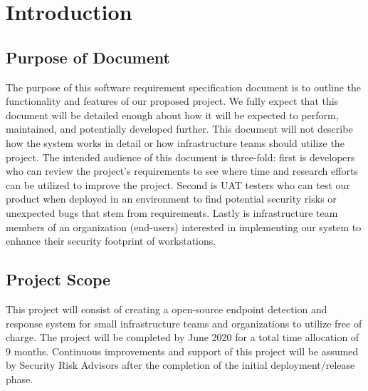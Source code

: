\documentclass{scrreprt}
\begin{document}
\chapter{Introduction}

\section{Purpose of Document}
The purpose of this software requirement specification document is to outline the functionality and features of our proposed project. We fully expect that this document will be detailed enough about how it will be expected to perform, maintained, and potentially developed further. This document will not describe how the system works in detail or how infrastructure teams should utilize the project. The intended audience of this document is three-fold: first is developers who can review the project’s requirements to see where time and research efforts can be utilized to improve the project. Second is UAT testers who can test our product when deployed in an environment to find potential security risks or unexpected bugs that stem from requirements. Lastly is infrastructure team members of an organization (end-users) interested in implementing our system to enhance their security footprint of workstations. 

\section{Project Scope}
This project will consist of creating a open-source endpoint detection and response system for small infrastructure teams and organizations to utilize free of charge. The project will be completed by June 2020 for a total time allocation of 9 months. Continuous improvements and support of this project will be assumed by Security Risk Advisors after the completion of the initial deployment/release phase. 
\end{document}
